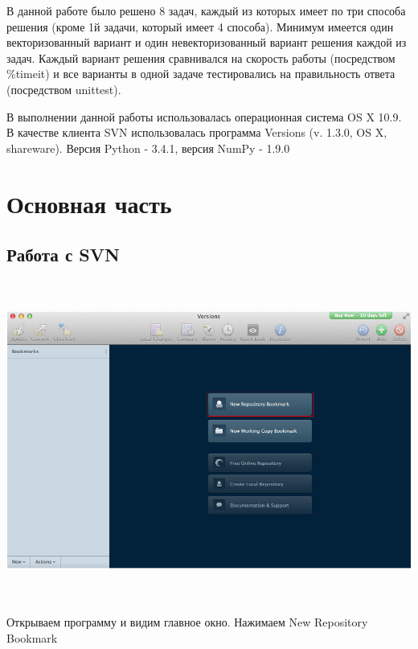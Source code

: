 \documentclass[12pt, a4paper]{article}
\begin{document}
		В данной работе было решено 8 задач, каждый из которых имеет по три способа решения (кроме 1й задачи, который имеет 4 способа). Минимум имеется один векторизованный вариант и один невекторизованный вариант решения каждой из задач. Каждый вариант решения сравнивался на скорость работы (посредством \%timeit) и все варианты в одной задаче тестировались на правильность ответа (посредством unittest).

		В выполнении данной работы использовалась операционная система OS X 10.9. В качестве клиента SVN использовалась программа Versions (v. 1.3.0, OS X, shareware). Версия Python - 3.4.1, версия NumPy - 1.9.0


	\newpage
	\section{Основная часть}
		\subsection{Работа с SVN}

			\begin{center}
				\includegraphics[height=10.5cm]{svn/svn_1.png}

				Открываем программу и видим главное окно. Нажимаем New Repository Bookmark \\
				~\newline
			\end{center}
\end{document}
